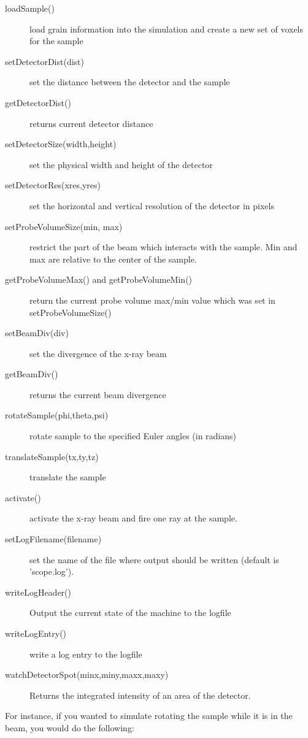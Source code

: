 \documentclass{article}
\begin{document}
	\begin{description}
	
	\item [loadSample()] load grain information into the simulation
	and create a new set of voxels for the sample
	\item [setDetectorDist(dist)]  set the distance between the detector
	and the sample
	\item [getDetectorDist()] returns current detector distance
	\item [setDetectorSize(width,height)] set the physical width and height of
	the detector
	\item [setDetectorRes(xres,yres)] set the horizontal and vertical
	resolution of the detector in pixels
	\item [setProbeVolumeSize(min, max)] restrict the part of the
	beam which interacts with the sample. Min and max are relative to
	the center of the sample.
	\item [getProbeVolumeMax() and getProbeVolumeMin()] 
	return the current probe volume max/min value which was set in 
	setProbeVolumeSize()
	\item [setBeamDiv(div)] set the divergence of the x-ray beam
	\item [getBeamDiv()] returns the current beam divergence
	\item [rotateSample(phi,theta,psi)] rotate sample to the specified
	Euler angles (in radians)
	\item [translateSample(tx,ty,tz)] translate the sample
	\item [activate()] activate the x-ray beam and fire one ray at the
	sample. 
	\item [setLogFilename(filename)] set the name of the file where
	output should be written (default is 'scope.log').
	\item [writeLogHeader()] Output the current state of the machine
	to the logfile
	\item [writeLogEntry()] write a log entry to the logfile 
	\item [watchDetectorSpot(minx,miny,maxx,maxy)] Returns the
	integrated intensity of an area of the detector.

	\end{description}


For instance, if you wanted to simulate rotating the sample while
it is in the beam, you would do the following:
\end{document}
